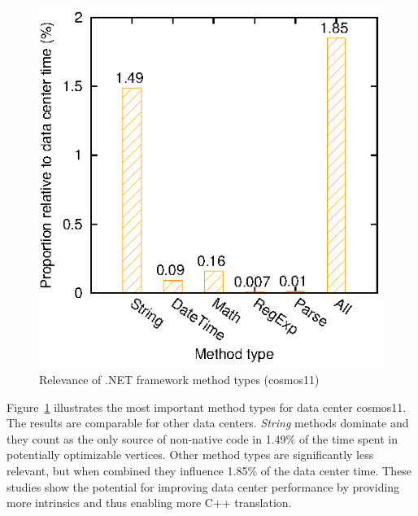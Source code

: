 \begin{figure}[ht]
\includegraphics{graphs/methodTypes}
\caption{Relevance of .NET framework method types (cosmos11)}
\label{fig:methodTypes}
\end{figure}

Figure~\ref{fig:methodTypes} illustrates the most important method types for data center cosmos11. The results are comparable for other data centers. \emph{String} methods dominate and they count as the only source of non-native code in  1.49\% of the time spent in potentially optimizable vertices. Other method types are significantly less relevant, but when combined they influence 1.85\% of the data center time. These studies show the potential for improving data center performance by providing more intrinsics and thus enabling more C++ translation.






